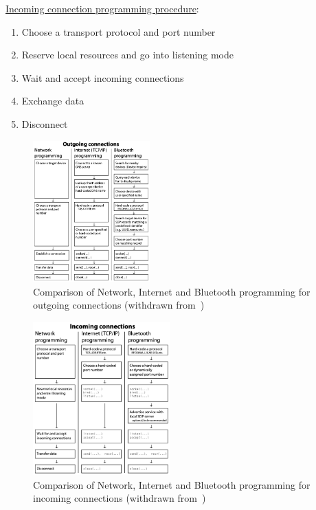 \uline{Incoming connection programming procedure}:
\begin{enumerate}
\item Choose a transport protocol and port number
\item Reserve local resources and go into listening mode
\item Wait and accept incoming connections
\item Exchange data
\item Disconnect
\end{enumerate}
\begin{figure}[!hbt]
\centering
    \includegraphics[width=0.40\textwidth]{./img/bt-outgoing.png}
  \caption{Comparison of Network, Internet and Bluetooth programming for
    outgoing connections (withdrawn from~\cite{huang2007bluetooth})}%
\label{fig:bt-outgoing}
\end{figure}
%
%
\begin{figure}[!hbt]
\centering
    \includegraphics[width=0.47\textwidth]{./img/bt-incoming.png}
  \caption{Comparison of Network, Internet and Bluetooth programming for
    incoming connections (withdrawn from~\cite{huang2007bluetooth})}%
\label{fig:bt-incoming}
\end{figure}
%
